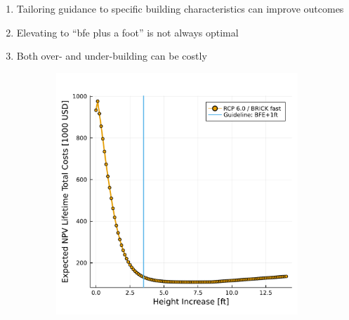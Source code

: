 \documentclass[12pt]{article}
\begin{document}
\begin{enumerate}
    \item Tailoring guidance to specific building characteristics can improve outcomes
    \item Elevating to ``\gls{bfe} plus a foot'' is not always optimal \citep[this is consistent with][]{zarekarizi_suboptimal:2020,xian_elevation:2017}
    \item Both over- and under-building can be costly \citep{ansar_bigisfragile:2017,DossGollin:2019}
\end{enumerate}

\begin{figure}
    \centering
    \begin{subfigure}{0.48\textwidth}
        \includegraphics[width=\textwidth]{5.5.pdf}
    \end{subfigure}
    \hfill
    \begin{subfigure}{0.48\textwidth}

\end{subfigure}
\end{figure}
\end{document}

